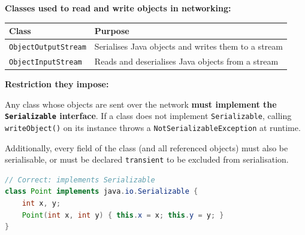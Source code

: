 \documentclass[12pt,a3paper]{article}
\begin{document}
\begin{enumerate}
\begin{tcolorbox}
\begin{center}
\end{center}

\medskip
\textbf{Classes used to read and write objects in
networking:}

\begin{center}
\small
\begin{tabular}{@{}ll@{}}
\toprule
\textbf{Class} & \textbf{Purpose} \\
\midrule
\texttt{ObjectOutputStream} &
  Serialises Java objects and writes them to a stream \\
\texttt{ObjectInputStream} &
  Reads and deserialises Java objects from a stream \\
\bottomrule
\end{tabular}
\end{center}

\medskip
\textbf{Restriction they impose:}

Any class whose objects are sent over the network
\textbf{must implement the \texttt{Serializable}
interface}. If a class does not implement
\texttt{Serializable}, calling
\texttt{writeObject()} on its instance throws a
\texttt{NotSerializableException} at runtime.

Additionally, every field of the class (and all
referenced objects) must also be serialisable, or
must be declared \texttt{transient} to be excluded
from serialisation.

\begin{lstlisting}[language=Java]
// Correct: implements Serializable
class Point implements java.io.Serializable {
    int x, y;
    Point(int x, int y) { this.x = x; this.y = y; }
}


\end{lstlisting}
\end{tcolorbox}
\end{enumerate}
\end{document}
